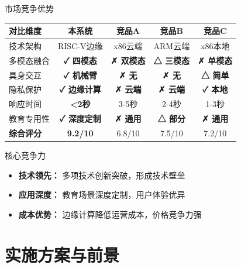 \documentclass[aspectratio=169,12pt]{beamer}
\newcommand{\highlight}[1]{\textcolor{primaryblue}{\textbf{#1}}}
\newcommand{\success}[1]{\textcolor{successgreen}{\textbf{#1}}}
\newcommand{\warning}[1]{\textcolor{warningyellow}{\textbf{#1}}}
\newcommand{\danger}[1]{\textcolor{dangerred}{\textbf{#1}}}
\begin{document}
\begin{frame}{市场竞争优势}
    \begin{table}[h]
        \centering
        \footnotesize
        \begin{tabular}{|l|c|c|c|c|}
        \hline
        \textbf{对比维度} & \textbf{本系统} & \textbf{竞品A} & \textbf{竞品B} & \textbf{竞品C} \\
        \hline
        技术架构 & RISC-V边缘 & x86云端 & ARM云端 & x86本地 \\
        \hline
        多模态融合 & \success{✓ 四模态} & \danger{✗ 双模态} & \warning{△ 三模态} & \danger{✗ 单模态} \\
        \hline
        具身交互 & \success{✓ 机械臂} & \danger{✗ 无} & \danger{✗ 无} & \warning{△ 简单} \\
        \hline
        隐私保护 & \success{✓ 边缘计算} & \danger{✗ 云端} & \danger{✗ 云端} & \success{✓ 本地} \\
        \hline
        响应时间 & \success{<2秒} & 3-5秒 & 2-4秒 & 1-3秒 \\
        \hline
        教育专用性 & \success{✓ 深度定制} & \danger{✗ 通用} & \warning{△ 部分} & \danger{✗ 通用} \\
        \hline
        \textbf{综合评分} & \success{\textbf{9.2/10}} & 6.8/10 & 7.5/10 & 7.2/10 \\
        \hline
        \end{tabular}
    \end{table}
    
    \begin{alertblock}{核心竞争力}
        \begin{itemize}
            \item \highlight{技术领先：} 多项技术创新突破，形成技术壁垒
            \item \highlight{应用深度：} 教育场景深度定制，用户体验优异  
            \item \highlight{成本优势：} 边缘计算降低运营成本，价格竞争力强
        \end{itemize}
    \end{alertblock}
\end{frame}

\section{实施方案与前景}
\end{document}
